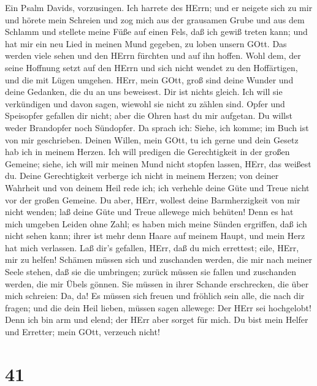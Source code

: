  Ein Psalm Davids, vorzusingen.  Ich harrete des
HErrn; und er neigete sich zu mir und hörete mein Schreien 
und zog mich aus der grausamen Grube und aus dem Schlamm und stellete
meine Füße auf einen Fels, daß ich gewiß treten kann;  und
hat mir ein neu Lied in meinen Mund gegeben, zu loben unsern GOtt. Das
werden viele sehen und den HErrn fürchten und auf ihn hoffen.
 Wohl dem, der seine Hoffnung setzt auf den HErrn und sich
nicht wendet zu den Hoffärtigen, und die mit Lügen umgehen. 
HErr, mein GOtt, groß sind deine Wunder und deine Gedanken, die du an
uns beweisest. Dir ist nichts gleich. Ich will sie verkündigen und davon
sagen, wiewohl sie nicht zu zählen sind.  Opfer und
Speisopfer gefallen dir nicht; aber die Ohren hast du mir aufgetan. Du
willst weder Brandopfer noch Sündopfer.  Da sprach ich:
Siehe, ich komme; im Buch ist von mir geschrieben.  Deinen
Willen, mein GOtt, tu ich gerne und dein Gesetz hab ich in meinem
Herzen.  Ich will predigen die Gerechtigkeit in der großen
Gemeine; siehe, ich will mir meinen Mund nicht stopfen lassen, HErr, das
weißest du.  Deine Gerechtigkeit verberge ich nicht in
meinem Herzen; von deiner Wahrheit und von deinem Heil rede ich; ich
verhehle deine Güte und Treue nicht vor der großen Gemeine.
 Du aber, HErr, wollest deine Barmherzigkeit von mir nicht
wenden; laß deine Güte und Treue allewege mich behüten! 
Denn es hat mich umgeben Leiden ohne Zahl; es haben mich meine Sünden
ergriffen, daß ich nicht sehen kann; ihrer ist mehr denn Haare auf
meinem Haupt, und mein Herz hat mich verlassen.  Laß dir's
gefallen, HErr, daß du mich errettest; eile, HErr, mir zu helfen!
 Schämen müssen sich und zuschanden werden, die mir nach
meiner Seele stehen, daß sie die umbringen; zurück müssen sie fallen und
zuschanden werden, die mir Übels gönnen.  Sie müssen in
ihrer Schande erschrecken, die über mich schreien: Da, da! 
Es müssen sich freuen und fröhlich sein alle, die nach dir fragen; und
die dein Heil lieben, müssen sagen allewege: Der HErr sei hochgelobt!
 Denn ich bin arm und elend; der HErr aber sorget für mich.
Du bist mein Helfer und Erretter; mein GOtt, verzeuch nicht!

\hypertarget{section-40}{%
\section{41}\label{section-40}}

